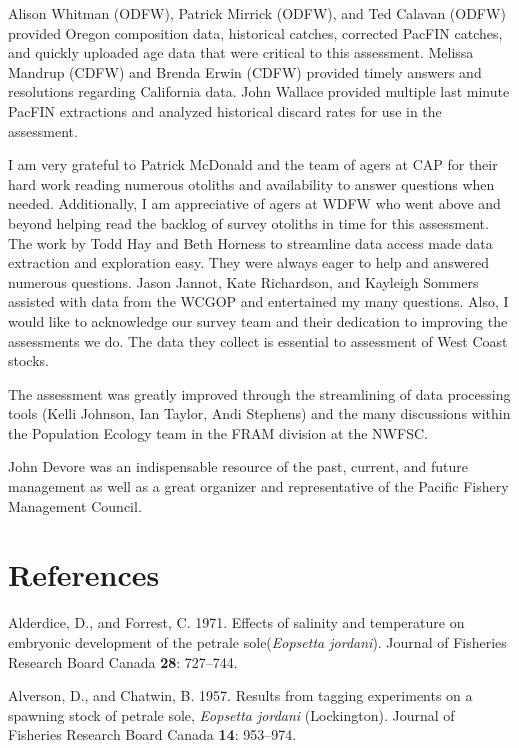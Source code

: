 \documentclass[12pt,]{article}
\begin{document}
Alison Whitman (ODFW), Patrick Mirrick (ODFW), and Ted Calavan (ODFW)
provided Oregon composition data, historical catches, corrected PacFIN
catches, and quickly uploaded age data that were critical to this
assessment. Melissa Mandrup (CDFW) and Brenda Erwin (CDFW) provided
timely answers and resolutions regarding California data. John Wallace
provided multiple last minute PacFIN extractions and analyzed historical
discard rates for use in the assessment.

I am very grateful to Patrick McDonald and the team of agers at CAP for
their hard work reading numerous otoliths and availability to answer
questions when needed. Additionally, I am appreciative of agers at WDFW
who went above and beyond helping read the backlog of survey otoliths in
time for this assessment. The work by Todd Hay and Beth Horness to
streamline data access made data extraction and exploration easy. They
were always eager to help and answered numerous questions. Jason Jannot,
Kate Richardson, and Kayleigh Sommers assisted with data from the WCGOP
and entertained my many questions. Also, I would like to acknowledge our
survey team and their dedication to improving the assessments we do. The
data they collect is essential to assessment of West Coast stocks.

The assessment was greatly improved through the streamlining of data
processing tools (Kelli Johnson, Ian Taylor, Andi Stephens) and the many
discussions within the Population Ecology team in the FRAM division at
the NWFSC.

John Devore was an indispensable resource of the past, current, and
future management as well as a great organizer and representative of the
Pacific Fishery Management Council.

\newpage

\FloatBarrier

\section{References}\label{references}

\color{black}

\hypertarget{refs}{}
\hypertarget{ref-alderdice_effects_1971}{}
Alderdice, D., and Forrest, C. 1971. Effects of salinity and temperature
on embryonic development of the petrale sole(\emph{Eopsetta jordani}).
Journal of Fisheries Research Board Canada \textbf{28}: 727--744.

\hypertarget{ref-alverson_results_1957}{}
Alverson, D., and Chatwin, B. 1957. Results from tagging experiments on
a spawning stock of petrale sole, \emph{Eopsetta jordani} (Lockington).
Journal of Fisheries Research Board Canada \textbf{14}: 953--974.
\end{document}
